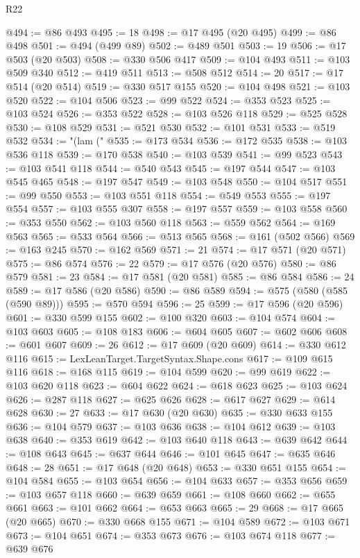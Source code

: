 \begin{lexlean}{R22}
\begin{coremodule}
{{{{{{{{{{{{{{{{{{{{{{{{{{{{{{{{{{{{{{{{{{{{{{{{{{{{@494 := @86 @493
@495 := 18
@498 := @17 @495 (@20 @495)
@499 := @86 @498
@501 := @494 (@499 @89)
@502 := @489 @501
@503 := 19
@506 := @17 @503 (@20 @503)
@508 := @330 @506 @417
@509 := @104 @493
@511 := @103 @509 @340
@512 := @419 @511
@513 := @508 @512
@514 := 20
@517 := @17 @514 (@20 @514)
@519 := @330 @517 @155
@520 := @104 @498
@521 := @103 @520
@522 := @104 @506
@523 := @99 @522
@524 := @353 @523
@525 := @103 @524
@526 := @353 @522
@528 := @103 @526 @118
@529 := @525 @528
@530 := @108 @529
@531 := @521 @530
@532 := @101 @531
@533 := @519 @532
@534 := "(lam ("
@535 := @173 @534
@536 := @172 @535
@538 := @103 @536 @118
@539 := @170 @538
@540 := @103 @539
@541 := @99 @523
@543 := @103 @541 @118
@544 := @540 @543
@545 := @197 @544
@547 := @103 @545 @465
@548 := @197 @547
@549 := @103 @548
@550 := @104 @517
@551 := @99 @550
@553 := @103 @551 @118
@554 := @549 @553
@555 := @197 @554
@557 := @103 @555 @307
@558 := @197 @557
@559 := @103 @558
@560 := @353 @550
@562 := @103 @560 @118
@563 := @559 @562
@564 := @169 @563
@565 := @533 @564
@566 := @513 @565
@568 := @161 (@502 @566)
@569 := @163 @245
@570 := @162 @569
@571 := 21
@574 := @17 @571 (@20 @571)
@575 := @86 @574
@576 := 22
@579 := @17 @576 (@20 @576)
@580 := @86 @579
@581 := 23
@584 := @17 @581 (@20 @581)
@585 := @86 @584
@586 := 24
@589 := @17 @586 (@20 @586)
@590 := @86 @589
@594 := @575 (@580 (@585 (@590 @89)))
@595 := @570 @594
@596 := 25
@599 := @17 @596 (@20 @596)
@601 := @330 @599 @155
@602 := @100 @320
@603 := @104 @574
@604 := @103 @603
@605 := @108 @183
@606 := @604 @605
@607 := @602 @606
@608 := @601 @607
@609 := 26
@612 := @17 @609 (@20 @609)
@614 := @330 @612 @116
@615 := LexLeanTarget.TargetSyntax.Shape.cons
@617 := @109 @615 @116
@618 := @168 @115
@619 := @104 @599
@620 := @99 @619
@622 := @103 @620 @118
@623 := @604 @622
@624 := @618 @623
@625 := @103 @624
@626 := @287 @118
@627 := @625 @626
@628 := @617 @627
@629 := @614 @628
@630 := 27
@633 := @17 @630 (@20 @630)
@635 := @330 @633 @155
@636 := @104 @579
@637 := @103 @636
@638 := @104 @612
@639 := @103 @638
@640 := @353 @619
@642 := @103 @640 @118
@643 := @639 @642
@644 := @108 @643
@645 := @637 @644
@646 := @101 @645
@647 := @635 @646
@648 := 28
@651 := @17 @648 (@20 @648)
@653 := @330 @651 @155
@654 := @104 @584
@655 := @103 @654
@656 := @104 @633
@657 := @353 @656
@659 := @103 @657 @118
@660 := @639 @659
@661 := @108 @660
@662 := @655 @661
@663 := @101 @662
@664 := @653 @663
@665 := 29
@668 := @17 @665 (@20 @665)
@670 := @330 @668 @155
@671 := @104 @589
@672 := @103 @671
@673 := @104 @651
@674 := @353 @673
@676 := @103 @674 @118
@677 := @639 @676
}}}}}}}}}}}}}}}}}}}}}}}}}}}}}}}}}}}}}}}}}}}}}}}}}}}}
\end{coremodule}
\end{lexlean}
